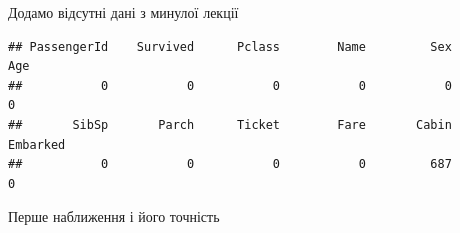 \documentclass[ignorenonframetext,]{beamer}
\newenvironment{Shaded}{\begin{snugshade}}{\end{snugshade}}
\newcommand{\DataTypeTok}[1]{\textcolor[rgb]{0.13,0.29,0.53}{#1}}
\newcommand{\DecValTok}[1]{\textcolor[rgb]{0.00,0.00,0.81}{#1}}
\newcommand{\KeywordTok}[1]{\textcolor[rgb]{0.13,0.29,0.53}{\textbf{#1}}}
\newcommand{\NormalTok}[1]{#1}
\newcommand{\OperatorTok}[1]{\textcolor[rgb]{0.81,0.36,0.00}{\textbf{#1}}}
\newcommand{\OtherTok}[1]{\textcolor[rgb]{0.56,0.35,0.01}{#1}}
\newcommand{\StringTok}[1]{\textcolor[rgb]{0.31,0.60,0.02}{#1}}
\begin{document}
\begin{frame}[fragile]{Додамо відсутні дані з минулої лекції}
\protect\hypertarget{ux434ux43eux434ux430ux43cux43e-ux432ux456ux434ux441ux443ux442ux43dux456-ux434ux430ux43dux456-ux437-ux43cux438ux43dux443ux43bux43eux457-ux43bux435ux43aux446ux456ux457}{}

\begin{Shaded}
\end{Shaded}

\begin{verbatim}
## PassengerId    Survived      Pclass        Name         Sex         Age 
##           0           0           0           0           0           0 
##       SibSp       Parch      Ticket        Fare       Cabin    Embarked 
##           0           0           0           0         687           0
\end{verbatim}

\end{frame}

\begin{frame}[fragile]{Перше наближення і його точність}
\protect\hypertarget{ux43fux435ux440ux448ux435-ux43dux430ux431ux43bux438ux436ux435ux43dux43dux44f-ux456-ux439ux43eux433ux43e-ux442ux43eux447ux43dux456ux441ux442ux44c}{}

\begin{Shaded}
\end{Shaded}

\end{frame}
\end{document}
